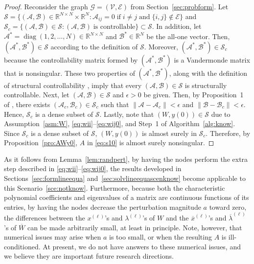 \documentclass[11pt]{article}
\theoremstyle{plain}
\theoremstyle{definition}
\theoremstyle{remark}
\begin{document}
\begin{proof}
Reconsider the graph $\mathcal{G}=(\mathcal{V},\mathcal{E})$ from Section~\ref{sec:probform}. Let $\mathcal{S}=\{(\mathcal{A},\mathcal{B})\in\mathbb{R}^{N\times N}\times\mathbb{R}^N:\mathcal{A}_{ij}=0\;\text{if}\;i\ne j\;\text{and}\;\{i,j\}\notin\mathcal{E}\}$ and $\mathcal{S}_c=\{(\mathcal{A},\mathcal{B})\in\mathcal{S}:(\mathcal{A},\mathcal{B})\;\text{is controllable}\}\subset\mathcal{S}$. In addition, let $\mathcal{A}^*=\operatorname{diag}(1,2,\ldots,N)\in\mathbb{R}^{N\times N}$ and $\mathcal{B}^*\in\mathbb{R}^N$ be the all-one vector. Then, $(\mathcal{A}^*,\mathcal{B}^*)\in\mathcal{S}$ according to the definition of $\mathcal{S}$. Moreover, $(\mathcal{A}^*,\mathcal{B}^*)\in\mathcal{S}_c$ because the controllability matrix formed by $(\mathcal{A}^*,\mathcal{B}^*)$ is a Vandermonde matrix that is nonsingular. These two properties of $(\mathcal{A}^*,\mathcal{B}^*)$, along with the definition of structural controllability \cite{LinCT74}, imply that every $(\mathcal{A},\mathcal{B})\in\mathcal{S}$ is structurally controllable. Next, let $(\mathcal{A},\mathcal{B})\in\mathcal{S}$ and $\epsilon>0$ be given. Then, by Proposition~1 of \cite{LinCT74}, there exists $(\mathcal{A}_c,\mathcal{B}_c)\in\mathcal{S}_c$ such that $\|\mathcal{A}-\mathcal{A}_c\|<\epsilon$ and $\|\mathcal{B}-\mathcal{B}_c\|<\epsilon$. Hence, $\mathcal{S}_c$ is a dense subset of $\mathcal{S}$. Lastly, note that $(W,y(0))\in\mathcal{S}$ due to Assumption~\ref{asm:W}, \eqref{eq:wii}--\eqref{eq:wij0}, and Step~1 of Algorithm~\ref{alg:know}. Since $\mathcal{S}_c$ is a dense subset of $\mathcal{S}$, $(W,y(0))$ is almost surely in $\mathcal{S}_c$. Therefore, by Proposition~\ref{pro:AWy0}, $A$ in \eqref{eq:s10} is almost surely nonsingular.
\end{proof}

As it follows from Lemma~\ref{lem:randpert}, by having the nodes perform the extra step described in \eqref{eq:wii}--\eqref{eq:wij0}, the results developed in Sections~\ref{sec:formlineequa} and~\ref{sec:solvlineequascenknow} become applicable to this Scenario~\ref{sce:notknow}. Furthermore, because both the characteristic polynomial coefficients and eigenvalues of a matrix are continuous functions of its entries, by having the nodes decrease the perturbation magnitude $a$ toward zero, the differences between the $x^{(\ell)}$'s and $\lambda^{(\ell)}$'s of $W$ and the $\overline{x}^{(\ell)}$'s and $\overline{\lambda}^{(\ell)}$'s of $\overline{W}$ can be made arbitrarily small, at least in principle. Note, however, that numerical issues may arise when $a$ is too small, or when the resulting $A$ is ill-conditioned. At present, we do not have answers to these numerical issues, and we believe they are important future research directions.
\end{document}

